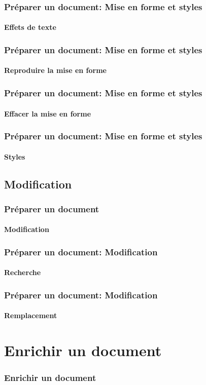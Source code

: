 \documentclass[xcolor=table]{beamer}
\begin{document}
\begin{frame}
\frametitle{Préparer un document: Mise en forme et styles}
\framesubtitle{Effets de texte}

\end{frame}

\begin{frame}
\frametitle{Préparer un document: Mise en forme et styles}
\framesubtitle{Reproduire la mise en forme}

\end{frame}

\begin{frame}
\frametitle{Préparer un document: Mise en forme et styles}
\framesubtitle{Effacer la mise en forme}

\end{frame}

\begin{frame}
\frametitle{Préparer un document: Mise en forme et styles}
\framesubtitle{Styles}

\end{frame}

\subsection{Modification}%

\begin{frame}
\frametitle{Préparer un document}
\framesubtitle{Modification}

\end{frame}

\begin{frame}
\frametitle{Préparer un document: Modification}
\framesubtitle{Recherche}

\end{frame}

\begin{frame}
\frametitle{Préparer un document: Modification}
\framesubtitle{Remplacement}

\end{frame}

\section{Enrichir un document}

\begin{frame}
\frametitle{Enrichir un document}

\end{frame}
\end{document}
